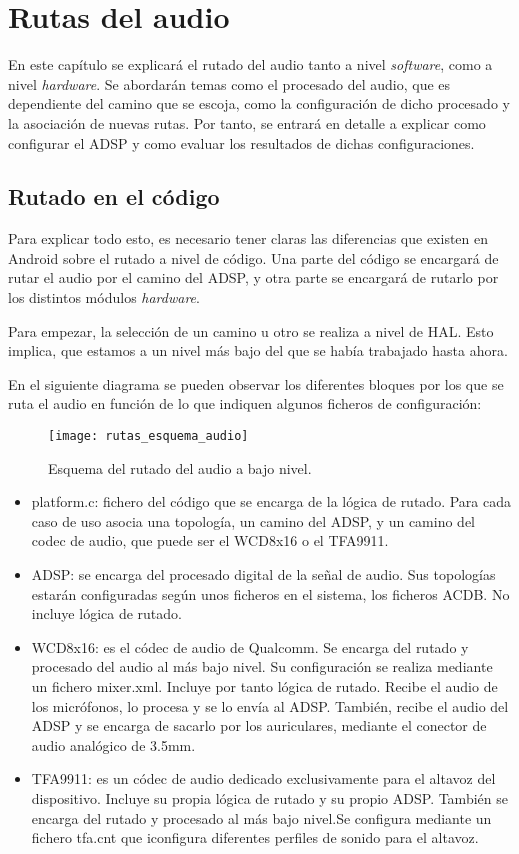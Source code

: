 \chapter{Rutas del audio}\label{chap:rutas_audio}
En este capítulo se explicará el rutado del audio tanto a nivel \textit{software}, como a nivel \textit{hardware}. Se abordarán temas como el procesado del audio, que es dependiente del camino que se escoja, como la configuración de dicho procesado y la asociación de nuevas rutas. Por tanto, se entrará en detalle a explicar como configurar el \gls{ADSP} y como evaluar los resultados de dichas configuraciones.


\section{Rutado en el código}
Para explicar todo esto, es necesario tener claras las diferencias que existen en Android sobre el rutado a nivel de código. Una parte del código se encargará de rutar el audio por el camino del \gls{ADSP}, y otra parte se encargará de rutarlo por los distintos módulos \textit{hardware}.

Para empezar, la selección de un camino u otro se realiza a nivel de \gls{HAL}. Esto implica, que estamos a un nivel más bajo del que se había trabajado hasta ahora.

En el siguiente diagrama se pueden observar los diferentes bloques por los que se ruta el audio en función de lo que indiquen algunos ficheros de configuración:

\begin{figure}[H]
	\centering
	\texttt{[image: rutas\_esquema\_audio]}
	\caption{Esquema del rutado del audio a bajo nivel.}
	\label{figrutas_esquema}
\end{figure}

\begin{itemize}
	\item{platform.c: fichero del código que se encarga de la lógica de rutado. Para cada caso de uso asocia una topología, un camino del \gls{ADSP}, y un camino del codec de audio, que puede ser el WCD8x16 o el TFA9911.}
	\item{\gls{ADSP}: se encarga del procesado digital de la señal de audio. Sus topologías estarán configuradas según unos ficheros en el sistema, los ficheros \gls{ACDB}. No incluye lógica de rutado.}
	\item{WCD8x16: es el códec de audio de Qualcomm. Se encarga del rutado y procesado del audio al más bajo nivel. Su configuración se realiza mediante un fichero mixer.xml. Incluye por tanto lógica de rutado. Recibe el audio de los micrófonos, lo procesa y se lo envía al \gls{ADSP}. También, recibe el audio del \gls{ADSP} y se encarga de sacarlo por los auriculares, mediante el conector de audio analógico de 3.5mm.}
	\item{TFA9911: es un códec de audio dedicado exclusivamente para el altavoz del dispositivo. Incluye su propia lógica de rutado y su propio \gls{ADSP}. También se encarga del rutado y procesado al más bajo nivel.Se configura mediante un fichero tfa.cnt que iconfigura diferentes perfiles de sonido para el altavoz.}
\end{itemize}

